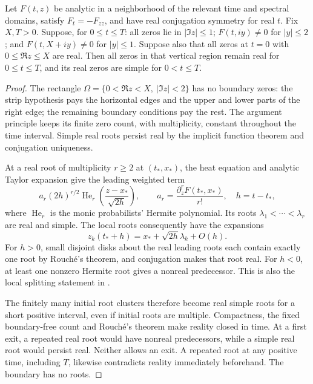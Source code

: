 \begin{lemma}\label{lem:finite-propagation}
Let $F(t,z)$ be analytic in a neighborhood of the relevant time and
spectral domains, satisfy $F_t=-F_{zz}$, and have real conjugation
symmetry for real $t$. Fix $X,T>0$. Suppose, for $0\le t\le T$:
all zeros lie in $|\Im z|\le1$; $F(t,iy)\ne0$ for $|y|\le2$;
and $F(t,X+iy)\ne0$ for $|y|\le1$. Suppose also that all zeros at
$t=0$ with $0\le\Re z\le X$ are real.
Then all zeros in that vertical region remain real for $0\le t\le T$,
and its real zeros are simple for $0<t\le T$.
\end{lemma}
\begin{proof}
The rectangle $\Omega=\{0<\Re z<X,\ |\Im z|<2\}$ has no
boundary zeros: the strip hypothesis pays the horizontal edges and
the upper and lower parts of the right edge; the remaining boundary
conditions pay the rest. The argument principle keeps its finite
zero count, with multiplicity, constant throughout the time interval.
Simple real roots persist real by the implicit function theorem
and conjugation uniqueness.

At a real root of multiplicity $r\ge2$ at $(t_*,x_*)$, the heat
equation and analytic Taylor expansion give the leading weighted term
\[
 a_r(2h)^{r/2}\operatorname{He}_r
       \left(\frac{z-x_*}{\sqrt{2h}}\right),\qquad
 a_r=\frac{\partial_z^rF(t_*,x_*)}{r!},\quad h=t-t_*,
\]
where $\operatorname{He}_r$ is the monic probabilists' Hermite polynomial.
Its roots $\lambda_1<\cdots<\lambda_r$ are real and simple.
The local roots consequently have the expansions
\[
 z_k(t_*+h)=x_*+\sqrt{2h}\lambda_k+O(h).
\]
For $h>0$, small disjoint disks about the real leading roots
each contain exactly one root by Rouch\'e's theorem, and conjugation
makes that root real. For $h<0$, at least one nonzero Hermite
root gives a nonreal predecessor. This is also the local splitting
statement in \cite[Proposition 3.1(ii)]{Polymath}.

The finitely many initial root clusters therefore become real
simple roots for a short positive interval, even if initial roots
are multiple. Compactness, the fixed boundary-free count and
Rouch\'e's theorem make reality closed in time. At a first exit,
a repeated real root would have nonreal predecessors, while a
simple real root would persist real. Neither allows an exit.
A repeated root at any positive time, including $T$, likewise
contradicts reality immediately beforehand. The boundary has no roots.
\end{proof}

